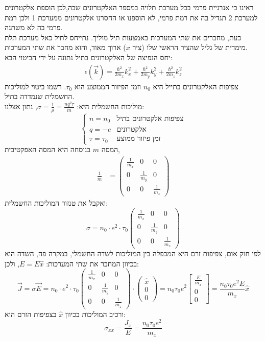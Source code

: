 \documentclass{article}
\begin{document}
\begin{Question}
ראינו כי אנרגיית פרמי בכל מערכת תלויה במספר האלקטרונים שבה,לכן הוספת אלקטרונים למערכת 2 תגדיל בה את רמת פרמי, לא הוספנו או החסרנו אלקטרונים ממערכת 1 ולכן רמת פרמי בה לא משתנה.\\
כעת, מחברים את שתי המערכות באמצעות תיל מוליך. נתייחס לתיל כאל מערכת תלת מימדית של גליל שהציר הראשי שלו (ציר $x$) ארוך מאוד, והוא מחבר את שתי המערכות.\\ יחס הנפיצה של האלקטרונים בתיל נתונה על ידי הביטוי הבא:
\begin{align*}
    \epsilon\left( \vec{k} \right)=\frac{\hbar^{2}}{2m_{x}}k_{x}^{2}+\frac{\hbar^{2}}{2m_{y}}k_{y}^{2}+\frac{\hbar^{2}}{2m_{z}}k_{z}^{2}
\end{align*}
צפיפות האלקטרונים בתייל היא $n_{0}$ וזמן הפיזור הממוצע הוא $\tau_{0}$. רשמו ביטוי למוליכות החשמלית שנמדדה בתיל.\\
מוליכות החשמלית היא: $\sigma=\frac{1}{\rho}=\frac{nq^{2}\tau}{m}$, נתון אצלנו:
$$\begin{cases}
    n=n_{0}&\text{צפיפות אלקטרונים בתיל}\\
    q=-e&\text{אלקטרונים}\\
    \tau=\tau_{0}&\text{זמן פיזור ממוצע}
\end{cases}
$$
המסה $m$ בנוסחה היא המסה האפקטיבית, 
\begin{align*}
    \frac{1}{m}&=\begin{pmatrix}
        \frac{1}{m_{x}}&0&0\\
        0&\frac{1}{m_{y}}&0\\
        0&0&\frac{1}{m_{z}}
    \end{pmatrix}
\end{align*}
ואקבל את טנזור המוליכות החשמלית:
$$\sigma = n_{0}\cdot e^{2}\cdot\tau_{0}\begin{pmatrix}
    \frac{1}{m_{x}}&0&0\\
    0&\frac{1}{m_{y}}&0\\
    0&0&\frac{1}{m_{z}}
\end{pmatrix}
$$
לפי חוק אום, צפיפות זרם היא המכפלה בין המוליכות לשדה החשמלי, במקרה פה, השדה הוא בכיוון המחבר את שתי המערכות: $E=E\hat{x}$, ולכן:
$$\vec{J}=\sigma\vec{E}=n_{0}\cdot e^{2}\cdot\tau_{0}
\begin{pmatrix}
    \frac{1}{m_{x}}&0&0\\
    0&\frac{1}{m_{y}}&0\\
    0&0&\frac{1}{m_{z}}
\end{pmatrix}\cdot
\begin{pmatrix}
    \hat{x}\\
    0\\
    0
\end{pmatrix} = n_{0} \tau_{0} e^{2} \begin{bmatrix}\frac{E}{m_{x}}\\0\\0\end{bmatrix}=\frac{n_{0} \tau_{0} e^{2}E}{m_{x}}\hat{x}
$$
ורכיב המוליכות בכיוון $\hat{x}$ בצפיפות הזרם הוא:
$$\sigma_{xx}=\frac{J_{x}}{E}=\frac{n_{0} \tau_{0} e^{2}}{m_{x}}$$
\end{Question}
\end{document}
